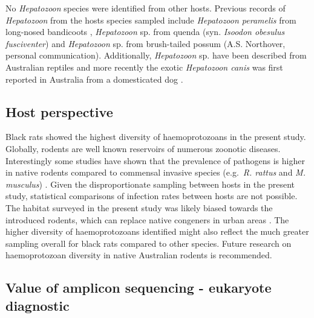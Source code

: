 \documentclass[a4paper, nobind]{templates/ociamthesis}
\begin{document}
No \emph{Hepatozoon} species were identified from other hosts.
Previous records of \emph{Hepatozoon} from the hosts species sampled include \emph{Hepatozoon peramelis} from long-nosed bandicoots \autocite{mackerrasHaematozoaAustralianMammals1959}, \emph{Hepatozoon} sp. from quenda (syn. \emph{Isoodon obesulus fusciventer}) \autocite{wicksMorphologicalMolecularCharacteristics2006} and \emph{Hepatozoon} sp. from brush-tailed possum (A.S. Northover, personal communication).
Additionally, \emph{Hepatozoon} sp. have been described from Australian reptiles \autocite{ujvariHighPrevalenceHepatozoon2004,vilcinsMolecularMorphologicalDescription2009} and more recently the exotic \emph{Hepatozoon canis} was first reported in Australia from a domesticated dog \autocite{greayAustralianDogDiagnosed2018}.

\hypertarget{host-perspective}{%
\subsection{Host perspective}\label{host-perspective}}

Black rats showed the highest diversity of haemoprotozoans in the present study.
Globally, rodents are well known reservoirs of numerous zoonotic diseases.
Interestingly some studies have shown that the prevalence of pathogens is higher in native rodents compared to commensal invasive species (e.g.~\emph{R. rattus} and \emph{M. musculus}) \autocite{dahmanaRodentsHostsPathogens2020,mangombiFirstInvestigationPathogenic2021}.
Given the disproportionate sampling between hosts in the present study, statistical comparisons of infection rates between hosts are not possible.
The habitat surveyed in the present study was likely biased towards the introduced rodents, which can replace native congeners in urban areas \autocite{banksReviewEvidencePotential2012}.
The higher diversity of haemoprotozoans identified might also reflect the much greater sampling overall for black rats compared to other species.
Future research on haemoprotozoan diversity in native Australian rodents is recommended.

\hypertarget{value-of-amplicon-sequencing---eukaryote-diagnostic}{%
\subsection{Value of amplicon sequencing - eukaryote diagnostic}\label{value-of-amplicon-sequencing---eukaryote-diagnostic}}
\end{document}
